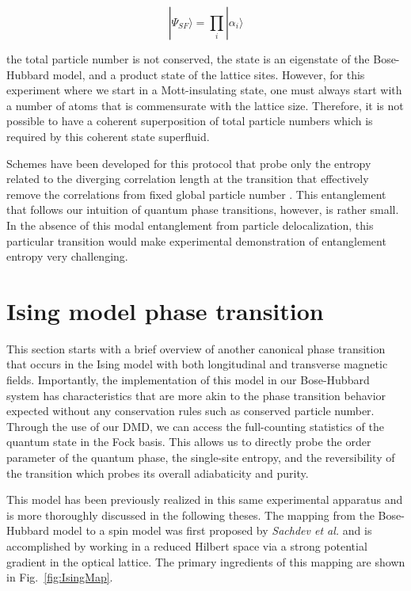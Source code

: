 \[
|\Psi_{SF}\rangle = \prod_i |\alpha_i \rangle 
\]

the total particle number is not conserved, the state is an eigenstate of the Bose-Hubbard model, and a product state of the lattice sites. However, for this experiment where we start in a Mott-insulating state, one must always start with a number of atoms that is commensurate with the lattice size.  Therefore, it is not possible to have a coherent superposition of total particle numbers which is required by this coherent state superfluid.

Schemes have been developed for this protocol that probe only the entropy related to the diverging correlation length at the transition that effectively remove the correlations from fixed global particle number \cite{Wiseman2003,Melko2016}. This entanglement that follows our intuition of quantum phase transitions, however, is rather small. In the absence of this modal entanglement from particle delocalization, this particular transition would make experimental demonstration of entanglement entropy very challenging. 

\section{Ising model phase transition}
\label{sec:ising}

This section starts with a brief overview of another canonical phase transition that occurs in the  Ising model with both longitudinal and transverse magnetic fields. Importantly, the implementation of this model in our Bose-Hubbard system has characteristics that are more akin to the phase transition behavior expected without any conservation rules such as conserved particle number. Through the use of our DMD, we can access the full-counting statistics of the quantum state in the Fock basis. This allows us to directly probe the order parameter of the quantum phase, the single-site entropy, and the reversibility of the transition which probes its overall adiabaticity and purity.

This model has been previously realized in this same experimental apparatus\cite{Simon2011} and is more thoroughly discussed in the following theses\cite{Bakr2011,Ma2014}.  The mapping from the Bose-Hubbard model to a spin model was first proposed by \emph{Sachdev et al.}\cite{Sachdev2002} and is accomplished by working in a reduced Hilbert space via a strong potential gradient in the optical lattice. The primary ingredients of this mapping are shown in Fig.~\ref{fig:IsingMap}.

